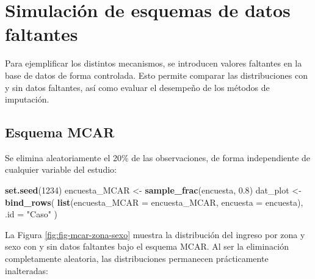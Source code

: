 \documentclass[
  spanish,
  12pt,
]{book}
\newenvironment{Shaded}{\begin{snugshade}}{\end{snugshade}}
\newcommand{\AttributeTok}[1]{\textcolor[rgb]{0.13,0.29,0.53}{#1}}
\newcommand{\DecValTok}[1]{\textcolor[rgb]{0.00,0.00,0.81}{#1}}
\newcommand{\FloatTok}[1]{\textcolor[rgb]{0.00,0.00,0.81}{#1}}
\newcommand{\FunctionTok}[1]{\textcolor[rgb]{0.13,0.29,0.53}{\textbf{#1}}}
\newcommand{\NormalTok}[1]{#1}
\newcommand{\OtherTok}[1]{\textcolor[rgb]{0.56,0.35,0.01}{#1}}
\newcommand{\StringTok}[1]{\textcolor[rgb]{0.31,0.60,0.02}{#1}}
\begin{document}
\section{Simulación de esquemas de datos faltantes}\label{sec-simulacion}

Para ejemplificar los distintos mecanismos, se introducen valores faltantes en la base de datos de forma controlada. Esto permite comparar las distribuciones con y sin datos faltantes, así como evaluar el desempeño de los métodos de imputación.

\subsection{Esquema MCAR}\label{esquema-mcar}

Se elimina aleatoriamente el 20\% de las observaciones, de forma independiente de cualquier variable del estudio:

\begin{Shaded}
\begin{Highlighting}[]
\FunctionTok{set.seed}\NormalTok{(}\DecValTok{1234}\NormalTok{)}
\NormalTok{encuesta\_MCAR }\OtherTok{\textless{}{-}} \FunctionTok{sample\_frac}\NormalTok{(encuesta, }\FloatTok{0.8}\NormalTok{)}
\NormalTok{dat\_plot }\OtherTok{\textless{}{-}} \FunctionTok{bind\_rows}\NormalTok{(}
  \FunctionTok{list}\NormalTok{(}\AttributeTok{encuesta\_MCAR =}\NormalTok{ encuesta\_MCAR, }\AttributeTok{encuesta =}\NormalTok{ encuesta),}
  \AttributeTok{.id =} \StringTok{"Caso"}
\NormalTok{)}
\end{Highlighting}
\end{Shaded}

La Figura \ref{fig:fig-mcar-zona-sexo} muestra la distribución del ingreso por zona y sexo con y sin datos faltantes bajo el esquema MCAR. Al ser la eliminación completamente aleatoria, las distribuciones permanecen prácticamente inalteradas:
\end{document}
